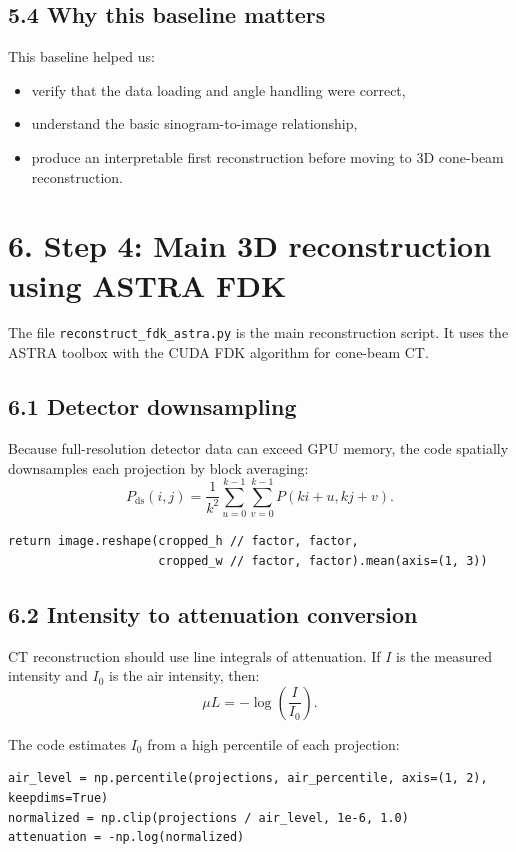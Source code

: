 \documentclass[12pt,a4paper]{article}
\begin{document}
\subsection*{5.4 Why this baseline matters}
This baseline helped us:
\begin{itemize}[leftmargin=*]
\item verify that the data loading and angle handling were correct,
\item understand the basic sinogram-to-image relationship,
\item produce an interpretable first reconstruction before moving to 3D cone-beam reconstruction.
\end{itemize}

\section*{6. Step 4: Main 3D reconstruction using ASTRA FDK}
The file \texttt{reconstruct\_fdk\_astra.py} is the main reconstruction script. It uses the ASTRA toolbox with the CUDA FDK algorithm for cone-beam CT.

\subsection*{6.1 Detector downsampling}
Because full-resolution detector data can exceed GPU memory, the code spatially downsamples each projection by block averaging:
\[
P_{\text{ds}}(i,j) = \frac{1}{k^2}\sum_{u=0}^{k-1}\sum_{v=0}^{k-1} P(ki+u, kj+v).
\]

\begin{lstlisting}[style=py,caption={Spatial projection downsampling}]
return image.reshape(cropped_h // factor, factor,
                     cropped_w // factor, factor).mean(axis=(1, 3))
\end{lstlisting}

\subsection*{6.2 Intensity to attenuation conversion}
CT reconstruction should use line integrals of attenuation. If $I$ is the measured intensity and $I_0$ is the air intensity, then:
\[
\mu L = -\log\left(\frac{I}{I_0}\right).
\]

The code estimates $I_0$ from a high percentile of each projection:
\begin{lstlisting}[style=py,caption={Beer-Lambert conversion}]
air_level = np.percentile(projections, air_percentile, axis=(1, 2), keepdims=True)
normalized = np.clip(projections / air_level, 1e-6, 1.0)
attenuation = -np.log(normalized)
\end{lstlisting}
\end{document}
